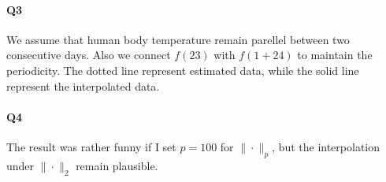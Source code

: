 \documentclass[11pt]{article}
\begin{document}
\paragraph{Q3}
We assume that human body temperature remain parellel between two consecutive days. Also we connect $f(23)$ with $f(1+24)$ to maintain the periodicity. The dotted line represent estimated data, while the solid line represent the interpolated data.
\begin{figure}[H]
	\centering
\end{figure}
\paragraph{Q4}
The result was rather funny if I set $p=100$ for $\|\cdot\|_p$, but the interpolation under $\|\cdot\|_2$ remain plausible.
\begin{figure}[H]
	\centering
\end{figure}
\end{document}
